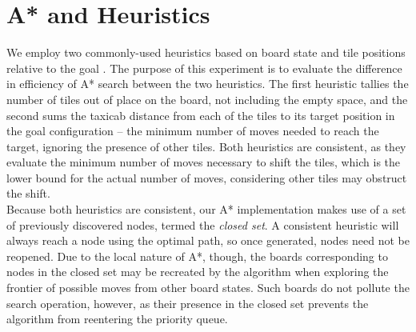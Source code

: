 
\section{A* and Heuristics}
\label{sec:background}

We employ two commonly-used heuristics based on board state and tile positions relative to the goal \cite{aima}.  The purpose of this experiment is to evaluate the difference in efficiency of A* search between the two heuristics.  The first heuristic tallies the number of tiles out of place on the board, not including the empty space, and the second sums the taxicab distance from each of the tiles to its target position in the goal configuration -- the minimum number of moves needed to reach the target, ignoring the presence of other tiles.  Both heuristics are consistent, as they evaluate the minimum number of moves necessary to shift the tiles, which is the lower bound for the actual number of moves, considering other tiles may obstruct the shift. \\

Because both heuristics are consistent, our A* implementation makes use of a set of previously discovered nodes, termed the \emph{closed set}.  A consistent heuristic will always reach a node using the optimal path, so once generated, nodes need not be reopened.  Due to the local nature of A*, though, the boards corresponding to nodes in the closed set may be recreated by the algorithm when exploring the frontier of possible moves from other board states.  Such boards do not pollute the search operation, however, as their presence in the closed set prevents the algorithm from reentering the priority queue.